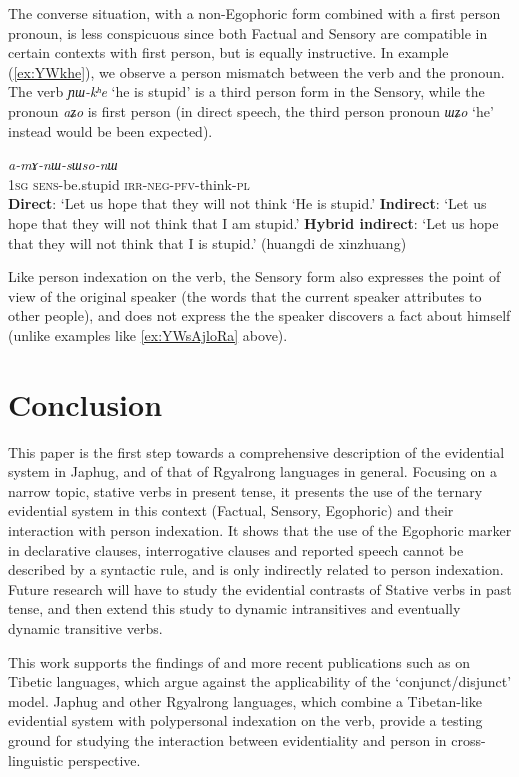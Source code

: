 \documentclass[oldfontcommands,oneside,a4paper,11pt]{article}
\newcommand{\ipa}[1]{{\phon\textit{#1}}} %
\newcommand{\refb}[1]{(\ref{#1})}
\newcommand{\bleu}[1]{{\color{blue}#1}}
\newcommand{\rouge}[1]{{\color{red}#1}}
\begin{document}
The converse situation, with a non-Egophoric form combined with a first person pronoun, is less conspicuous since both Factual and Sensory are compatible in certain contexts with first person, but is equally instructive. In example \refb{ex:YWkhe}, we observe a person mismatch between the verb and the pronoun. The verb \ipa{ɲɯ-kʰe} `he is stupid' is a third person form in the Sensory, while the pronoun \ipa{aʑo} is first person (in direct speech, the third person pronoun \ipa{ɯʑo} `he' instead would be been expected).

 \begin{exe}
\ex \label{ex:YWkhe}
 \gll
\rouge{\ipa{aʑo}} 	\bleu{\ipa{ɲɯ-kʰe}} 	\ipa{a-mɤ-nɯ-sɯso-nɯ} \\
\rouge{\textsc{1sg}} \bleu{\textsc{sens}-be.stupid} \textsc{irr-neg-pfv}-think-\textsc{pl}  \\
\glt  \textbf{Direct}: `Let us hope that they will not think `\rouge{He is stupid}.'
\glt  \textbf{Indirect}:  `Let us hope that they will not think that \rouge{I am stupid}.'
\glt  \textbf{Hybrid indirect}: `Let us hope that they will not think that \rouge{I} \bleu{is stupid}.' (huangdi de xinzhuang)
\end{exe}

Like person indexation on the verb, the Sensory form also expresses the point of view of the original speaker (the words that the current speaker attributes to other people), and does not express the the speaker discovers a fact about himself (unlike examples like \ref{ex:YWsAjloRa} above).

\section*{Conclusion}
This paper is the first step towards a comprehensive description of the evidential system in Japhug, and of that of Rgyalrong languages in general. Focusing on a narrow topic, stative verbs in present tense, it presents the use of the ternary evidential system in this context (Factual, Sensory, Egophoric) and their interaction with person indexation. It shows that the use of the Egophoric marker in declarative clauses, interrogative clauses and reported speech cannot be described by a syntactic rule, and is only indirectly related to person indexation. Future research will have to study the evidential contrasts of Stative verbs in past tense, and then extend this study to dynamic intransitives and eventually dynamic transitive verbs.

This work supports the findings of \citet{tournadre08conjunct} and more recent publications such as \citet{hill17evidential} on Tibetic languages, which argue against the applicability of the `conjunct/disjunct' model. Japhug and other Rgyalrong languages, which combine a Tibetan-like evidential system with polypersonal indexation on the verb, provide a testing ground for studying the interaction between evidentiality and person in cross-linguistic perspective.



\end{document}
